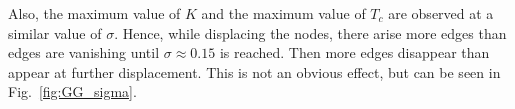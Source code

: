         Also, the maximum value of \(K\) and the maximum value of \(T_c\)
        are observed at a similar value of \(\sigma\). Hence, while displacing the nodes, there arise more edges
        than edges are vanishing until \(\sigma \approx 0.15\) is reached.
        Then more edges disappear than appear at further displacement. This
        is not an obvious effect, but can be seen in Fig.\ \ref{fig:GG_sigma}.
        \begin{figure}[htb]


\end{figure}
